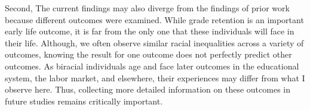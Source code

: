 \documentclass[
  12pt,
  letterpaper,
]{article}
\begin{document}
Second, The current findings may also diverge from the findings of prior
work because different outcomes were examined. While grade retention is
an important early life outcome, it is far from the only one that these
individuals will face in their life. Although, we often observe similar
racial inequalities across a variety of outcomes, knowing the result for
one outcome does not perfectly predict other outcomes. As biracial
individuals age and face later outcomes in the educational system, the
labor market, and elsewhere, their experiences may differ from what I
observe here. Thus, collecting more detailed information on these
outcomes in future studies remains critically important.



\printbibliography[title=References]



\processdelayedfloats
\end{document}
